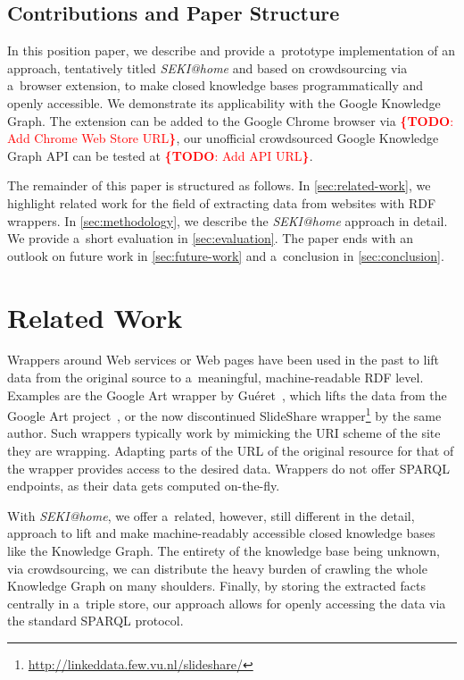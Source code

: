 \documentclass[runningheads,a4paper]{llncs}
\newcommand{\todo}[1]{\noindent\textcolor{red}{{\bf \{TODO}: #1{\bf \}}}}
\begin{document}
\subsection{Contributions and Paper Structure}
In this position paper, we describe and provide a~prototype implementation
of an approach, tentatively titled \emph{SEKI@home} and
based on crowdsourcing via a~browser extension,
to make closed knowledge bases programmatically and openly accessible.
We demonstrate its applicability with the Google Knowledge Graph.
The extension can be added to the Google Chrome browser via \todo{Add Chrome Web Store URL},
our unofficial crowdsourced Google Knowledge Graph API can be tested at
\todo{Add API URL}.

The remainder of this paper is structured as follows.
In \autoref{sec:related-work}, we highlight related work
for the field of extracting data from websites with RDF wrappers.
In \autoref{sec:methodology}, we describe the \emph{SEKI@home} approach in detail.
We provide a~short evaluation in \autoref{sec:evaluation}.
The paper ends with an outlook on future work in \autoref{sec:future-work}
and a~conclusion in \autoref{sec:conclusion}.

\section{Related Work} \label{sec:related-work}
Wrappers around Web services or Web pages have been used in the past
to lift data from the original source to a~meaningful, machine-readable RDF level.
Examples are the Google Art wrapper by Guéret~\cite{gueret2011},
which lifts the data from the Google Art project~\cite{sood2011},
or the now discontinued SlideShare wrapper\footnote{\url{http://linkeddata.few.vu.nl/slideshare/}} by the same author.
Such wrappers typically work by mimicking the URI scheme of the site they are wrapping.
Adapting parts of the URL of the original resource for that of the wrapper
provides access to the desired data.
Wrappers do not offer SPARQL endpoints, as their data gets computed on-the-fly.

With \emph{SEKI@home}, we offer a~related, however, still different in the detail,
approach to lift and make machine-readably accessible
closed knowledge bases like the Knowledge Graph.
The entirety of the knowledge base being unknown,
via crowdsourcing, we can distribute the heavy burden
of crawling the whole Knowledge Graph on many shoulders.
Finally, by storing the extracted facts centrally in a~triple store,
our approach allows for openly accessing the data via the standard SPARQL protocol.
\end{document}
